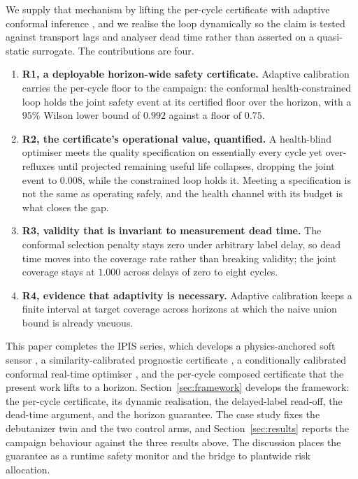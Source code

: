 \documentclass[review,12pt]{elsarticle}
\begin{document}
We supply that mechanism by lifting the per-cycle certificate with adaptive conformal inference
\citep{gibbs2021}, and we realise the loop dynamically so the claim is tested against transport
lags and analyser dead time rather than asserted on a quasi-static surrogate. The contributions
are four.
\begin{enumerate}
\item \textbf{R1, a deployable horizon-wide safety certificate.} Adaptive calibration carries the
  per-cycle floor to the campaign: the conformal health-constrained loop holds the joint safety
  event at its certified floor over the horizon, with a $95\%$ Wilson lower bound of $0.992$
  against a floor of $0.75$.
\item \textbf{R2, the certificate's operational value, quantified.} A health-blind optimiser
  meets the quality specification on essentially every cycle yet over-refluxes until projected
  remaining useful life collapses, dropping the joint event to $0.008$, while the constrained
  loop holds it. Meeting a specification is not the same as operating safely, and the health
  channel with its budget is what closes the gap.
\item \textbf{R3, validity that is invariant to measurement dead time.} The conformal selection
  penalty stays zero under arbitrary label delay, so dead time moves into the coverage rate
  rather than breaking validity; the joint coverage stays at $1.000$ across delays of zero to
  eight cycles.
\item \textbf{R4, evidence that adaptivity is necessary.} Adaptive calibration keeps a finite
  interval at target coverage across horizons at which the naive union bound is already vacuous.
\end{enumerate}

This paper completes the IPIS series, which develops a physics-anchored soft sensor
\citep{busico_m1}, a similarity-calibrated prognostic certificate \citep{busico_m2}, a
conditionally calibrated conformal real-time optimiser \citep{busico_m3}, and the per-cycle
composed certificate \citep{busico_m4} that the present work lifts to a horizon.
Section~\ref{sec:framework} develops the framework: the per-cycle certificate, its dynamic
realisation, the delayed-label read-off, the dead-time argument, and the horizon guarantee. The
case study fixes the debutanizer twin and the two control arms, and Section~\ref{sec:results}
reports the campaign behaviour against the three results above. The discussion places the
guarantee as a runtime safety monitor and the bridge to plantwide risk allocation.
\end{document}
